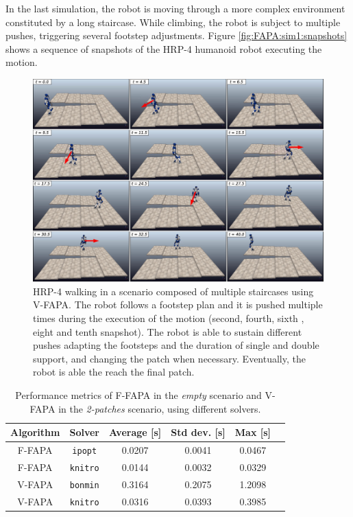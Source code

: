 In the last simulation, the robot is moving through a more complex environment
constituted by a long staircase. While climbing, the robot is subject to
multiple pushes, triggering several footstep adjustments.
Figure \ref{fig:FAPA:sim1:snapshots} shows a sequence of snapshots of the
HRP-4 humanoid robot executing the motion.
\begin{figure}
    \centering
    \includegraphics[width=\textwidth]{figures/staircase-multiple-pushes-snapshots.jpeg}
    \caption{HRP-4 walking in a scenario composed of multiple staircases
        using V-FAPA. The robot follows a footstep plan and it is pushed
        multiple times during the execution of the motion (second, fourth,
        sixth , eight and tenth snapshot). The robot is able to sustain
        different pushes adapting the footsteps and the duration of single
        and double support, and changing the patch when necessary.
        Eventually, the robot is able the reach the final patch.
    }
    \label{fig:FAPA:sim3:snapshots}
\end{figure}

\begin{table}
    \centering
    \begin{tabular}{*{6}{c}}
        Algorithm & Solver & Average [s] & Std dev. [s] & Max [s] \\
        \hline
        F-FAPA & \texttt{ipopt} & 0.0207 & 0.0041 & 0.0467 \\
        F-FAPA & \texttt{knitro} & 0.0144 & 0.0032 & 0.0329 \\
        V-FAPA & \texttt{bonmin} & 0.3164 & 0.2075 & 1.2098 \\
        V-FAPA & \texttt{knitro} & 0.0316 & 0.0393 & 0.3985
    \end{tabular}
    \caption{Performance metrics of F-FAPA in the {\em empty} scenario and
        V-FAPA in the {\em 2-patches} scenario, using different solvers.
    }
    \label{tab:benchmarks}
\end{table}

